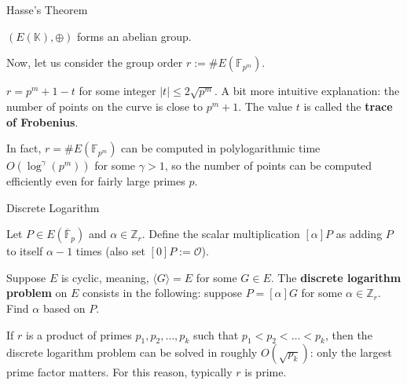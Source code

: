 \documentclass{zkdl-presentation-template}
\begin{document}
    \begin{frame}{Hasse's Theorem}
        \begin{theorem}
            $(E(\mathbb{K}),\oplus)$ forms an abelian group. \pause
        \end{theorem}
        \vspace{10px}

        Now, let us consider the group order $r := \#E(\mathbb{F}_{p^m})$. \pause

        \begin{theorem}
            $r = p^m + 1 - t$ for some integer $|t| \leq 2\sqrt{p^m}$. A bit more intuitive explanation: the number of points on the curve is close to $p^m+1$. The value $t$ is called the \textbf{trace of Frobenius}.\pause
        \end{theorem}

        \begin{remark}
            In fact, $r=\#E(\mathbb{F}_{p^m})$ can be computed in polylogarithmic time $O(\log^{\gamma}(p^m))$ for some $\gamma > 1$, so the number of points can be computed efficiently even for fairly large primes $p$.
        \end{remark}
    \end{frame}

    \begin{frame}{Discrete Logarithm}
        \begin{definition}
            Let $P \in E(\overline{\mathbb{F}}_p)$ and $\alpha \in \mathbb{Z}_r$. Define the scalar multiplication $[\alpha]P$ as adding $P$ to itself $\alpha-1$ times (also set $[0]P := \mathcal{O}$).\pause
        \end{definition}

        \begin{definition}
            Suppose $E$ is cyclic, meaning, $\langle G \rangle = E$ for some $G \in E$. The \textbf{discrete logarithm problem} on $E$ consists in the following: suppose $P = [\alpha]G$ for some $\alpha \in \mathbb{Z}_r$. Find $\alpha$ based on $P$.\pause
        \end{definition}

        \begin{remark}
            If $r$ is a product of primes $p_1,p_2,\dots,p_k$ such that $p_1<p_2<\dots< p_k$, then the discrete logarithm problem can be solved in roughly $O(\sqrt{p_k})$: only the largest prime factor matters. For this reason, typically $r$ is prime.
        \end{remark}
    \end{frame}

    \makeclosingframe
\end{document}
